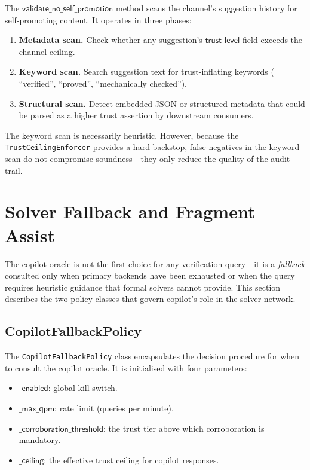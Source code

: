 \documentclass[11pt]{article}
\newcommand{\CopFallback}{\texttt{CopilotFallbackPolicy}}
\newcommand{\TCeil}{\texttt{TrustCeilingEnforcer}}
\begin{document}
The $\mathsf{validate\_no\_self\_promotion}$ method scans the
channel's suggestion history for self-promoting content.  It
operates in three phases:

\begin{enumerate}
  \item \textbf{Metadata scan.}  Check whether any suggestion's
    $\mathsf{trust\_level}$ field exceeds the channel ceiling.
  \item \textbf{Keyword scan.}  Search suggestion text for
    trust-inflating keywords (\eg{} ``verified'', ``proved'',
    ``mechanically checked'').
  \item \textbf{Structural scan.}  Detect embedded JSON or
    structured metadata that could be parsed as a higher trust
    assertion by downstream consumers.
\end{enumerate}

\begin{remark}
The keyword scan is necessarily heuristic.  However, because
the \TCeil{} provides a hard backstop, false negatives in the
keyword scan do not compromise soundness---they only reduce the
quality of the audit trail.
\end{remark}


\section{Solver Fallback and Fragment Assist}\label{sec:fallback}

The copilot oracle is not the first choice for any verification
query---it is a \emph{fallback} consulted only when primary
backends have been exhausted or when the query requires heuristic
guidance that formal solvers cannot provide.  This section describes
the two policy classes that govern copilot's role in the solver
network.

\subsection{CopilotFallbackPolicy}\label{sec:fallback-policy}

The \CopFallback{} class encapsulates the decision procedure for
when to consult the copilot oracle.  It is initialised with four
parameters:

\begin{itemize}
  \item $\mathsf{\_enabled}$: global kill switch.
  \item $\mathsf{\_max\_qpm}$: rate limit (queries per minute).
  \item $\mathsf{\_corroboration\_threshold}$: the trust tier
    above which corroboration is mandatory.
  \item $\mathsf{\_ceiling}$: the effective trust ceiling for
    copilot responses.
\end{itemize}
\end{document}
